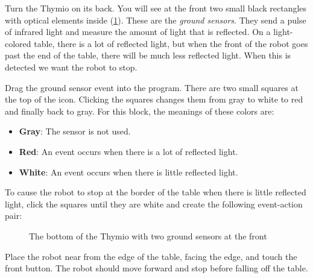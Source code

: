 
Turn the Thymio on its back. You will see at the front two small
black rectangles with optical elements inside (\cref{fig.bottom}).
These are the \emph{ground sensors}.
They send a pulse of infrared light and measure the amount of light that is reflected.
On a light-colored table, there is a
lot of reflected light, but when the front of the robot goes past the
end of the table, there will be much less reflected light. When this is
detected we want the robot to stop.


Drag the ground sensor event  into the program. There
are two small squares at the top of the icon. Clicking the squares
changes them from gray to white to red and finally back to gray.
For this block, the meanings of these colors are:

\begin{itemize}
\item \textbf{Gray}: The sensor is not used.
\item \textbf{Red}: An event occurs when there is a lot of reflected light.
\item \textbf{White}: An event occurs when there is little reflected light.
\end{itemize}


To cause the robot to stop at the border of the table when there is little reflected light, click
the squares until they are white and create the following event-action pair:

\begin{figure}
\begin{center}
\caption{The bottom of the Thymio with two ground sensors at the
 front}\label{fig.bottom}
\end{center}
\end{figure}

Place the robot near from the edge of the table, facing the edge, and touch the front button.
The robot should move forward and stop before falling off the table.


